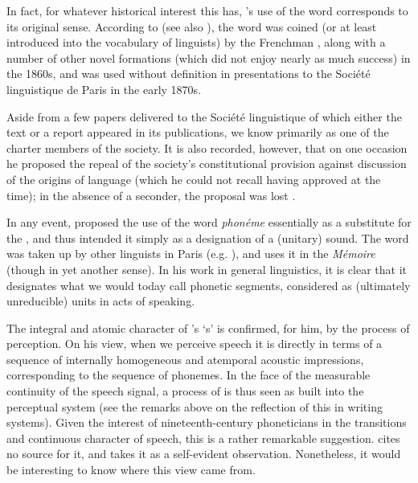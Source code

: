 In fact, for whatever historical interest this has, {\Saussure}'s use of
the word corresponds to its original sense. According to
\citet{mugdan11:phoneme,mugdan14:more-on-phoneme} (see also
\citealt{godel57:sources,Jakobson60:kazan.school}), the word was coined
(or at least introduced into the vocabulary of linguists) by the
Frenchman , along with a number of other
novel formations (which did not enjoy nearly as much success) in the
1860s, and was used without definition in presentations to the Société
linguistique de Paris in the early 1870s. 

Aside from a few papers delivered to the Société linguistique of which
either the text or a report appeared in its publications, we know
{\DufricheDesgenettes} primarily as one of the charter members of the
society. It is also recorded, however, that on one occasion he
proposed the repeal of the society's constitutional provision against
discussion of the origins of language (which he could not recall
having approved at the time); in the absence of a seconder, the
proposal was lost \citep[229]{koerner76:dufriche}.

In any event, {\DufricheDesgenettes} proposed the use of the word
\emph{phonéme} essentially as a substitute for the 
\emph{}, and thus intended it simply as a designation of a
(unitary) sound. The word was taken up by other linguists in Paris
(e.g. ), and {\Saussure} uses it in the \emph{Mémoire} (though
in yet another sense). In his work in general linguistics, it is clear
that it designates what we would today call phonetic segments,
considered as (ultimately unreducible) units in acts of speaking.

The integral and atomic character of {\Saussure}'s `s' is
confirmed, for him, by the process of perception. On his view, when we
perceive speech it is directly in terms of a sequence of internally
homogeneous and atemporal acoustic impressions, corresponding to the
sequence of phonemes. In the face of the measurable continuity of the
speech signal, a process of  is thus seen as built into
the perceptual system (see the remarks above on the reflection of this
 in writing systems). Given the interest of
nineteenth-century phoneticians in the transitions and continuous
character of speech, this is a rather remarkable suggestion. {\Saussure}
cites no source for it, and takes it as a self-evident
observation. Nonetheless, it would be interesting to know where this
view came from.

